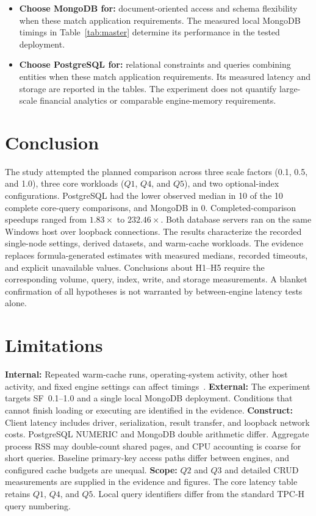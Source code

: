 \documentclass[10pt,a4paper,twocolumn]{article}
\begin{document}
\begin{itemize}
  \item \textbf{Choose MongoDB for:} document-oriented access and schema flexibility when these match application requirements. The measured local MongoDB timings in Table~\ref{tab:master} determine its performance in the tested deployment.
  \item \textbf{Choose PostgreSQL for:} relational constraints and queries combining entities when these match application requirements. Its measured latency and storage are reported in the tables. The experiment does not quantify large-scale financial analytics or comparable engine-memory requirements.
\end{itemize}

\section*{Conclusion}

The study attempted the planned comparison across three scale factors (0.1, 0.5, and 1.0), three core workloads ($Q1$, $Q4$, and $Q5$), and two optional-index configurations. PostgreSQL had the lower observed median in 10 of the 10 complete core-query comparisons, and MongoDB in 0. Completed-comparison speedups ranged from $1.83\times$ to $232.46\times$. Both database servers ran on the same Windows host over loopback connections. The results characterize the recorded single-node settings, derived datasets, and warm-cache workloads. The evidence replaces formula-generated estimates with measured medians, recorded timeouts, and explicit unavailable values. Conclusions about H1--H5 require the corresponding volume, query, index, write, and storage measurements. A blanket confirmation of all hypotheses is not warranted by between-engine latency tests alone.

\section*{Limitations}

\textbf{Internal:} Repeated warm-cache runs, operating-system activity, other host activity, and fixed engine settings can affect timings~\cite{raasveldt2018fair}. \textbf{External:} The experiment targets SF~0.1--1.0 and a single local MongoDB deployment. Conditions that cannot finish loading or executing are identified in the evidence. \textbf{Construct:} Client latency includes driver, serialization, result transfer, and loopback network costs. PostgreSQL NUMERIC and MongoDB double arithmetic differ. Aggregate process RSS may double-count shared pages, and CPU accounting is coarse for short queries. Baseline primary-key access paths differ between engines, and configured cache budgets are unequal. \textbf{Scope:} $Q2$ and $Q3$ and detailed CRUD measurements are supplied in the evidence and figures. The core latency table retains $Q1$, $Q4$, and $Q5$. Local query identifiers differ from the standard TPC-H query numbering.
\end{document}

